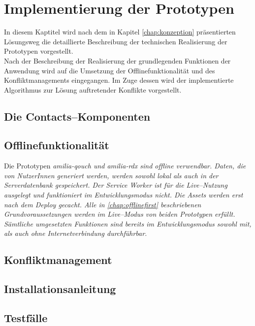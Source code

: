\chapter{\label{chap:implementierung}Implementierung der Prototypen}
In diesem Kaptitel wird nach dem in Kapitel \ref{chap:konzeption} präsentierten Lösungsweg die detaillierte Beschreibung der technischen Realisierung der Prototypen vorgestellt.\\
Nach der Beschreibung der Realisierung der grundlegenden Funktionen der Anwendung wird auf die Umsetzung der Offlinefunktionalität und des Konfliktmanagements eingegangen.
Im Zuge dessen wird der implementierte Algorithmus zur Lösung auftretender Konflikte vorgestellt.
%
%
%
\section{Die Contacts--Komponenten}

%
%
%
\section{Offlinefunktionalität}
Die Prototypen \it{amilia-qouch} und \it{amilia-rdx} sind offline verwendbar.
Daten, die von NutzerInnen generiert werden, werden sowohl lokal als auch in der Serverdatenbank gespeichert.
Der Service Worker ist für die Live--Nutzung ausgelegt und funktioniert im Entwicklungsmodus nicht. Die \gls{Assets} werden erst nach dem Deploy gecacht.
Alle in \autoref{chap:offlinefirst} beschriebenen Grundvoraussetzungen werden im Live--Modus von beiden Prototypen erfüllt.
Sämtliche umgesetzten Funktionen sind bereits im Entwicklungsmodus sowohl mit, als auch ohne Internetverbindung durchführbar.
%

%
%
%
\section{\label{chap:konfliktmanagement}Konfliktmanagement}

%
%
\section{Installationsanleitung}


%
%
\section{\label{chap:impl:test}Testfälle}
